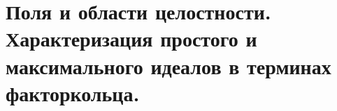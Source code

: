 \section{Поля и области целостности. Характеризация простого и максимального идеалов в терминах факторкольца.}

